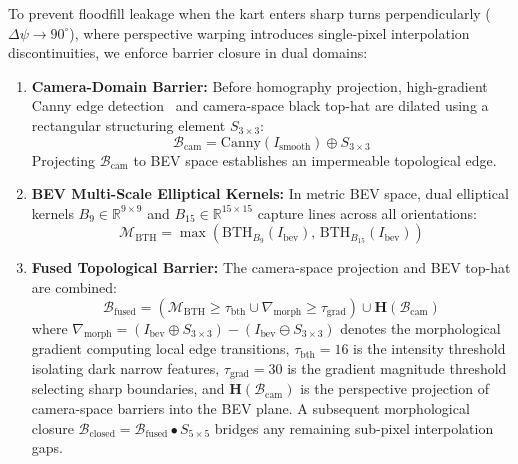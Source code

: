 \documentclass[10pt,journal,compsoc]{IEEEtran}
\begin{document}
To prevent floodfill leakage when the kart enters sharp turns perpendicularly ($\Delta\psi \to 90^\circ$), where perspective warping introduces single-pixel interpolation discontinuities, we enforce barrier closure in dual domains:
\begin{enumerate}
    \item \textbf{Camera-Domain Barrier:} Before homography projection, high-gradient Canny edge detection~\cite{canny1986computational} and camera-space black top-hat are dilated using a rectangular structuring element $S_{3 \times 3}$:
    \begin{equation}
    \mathcal{B}_{\text{cam}} = \text{Canny}(I_{\text{smooth}}) \oplus S_{3 \times 3}
    \end{equation}
    Projecting $\mathcal{B}_{\text{cam}}$ to BEV space establishes an impermeable topological edge.
    \item \textbf{BEV Multi-Scale Elliptical Kernels:} In metric BEV space, dual elliptical kernels $B_9 \in \mathbb{R}^{9 \times 9}$ and $B_{15} \in \mathbb{R}^{15 \times 15}$ capture lines across all orientations:
    \begin{equation}
    \mathcal{M}_{\text{BTH}} = \max\left(\text{BTH}_{B_9}(I_{\text{bev}}), \, \text{BTH}_{B_{15}}(I_{\text{bev}})\right)
    \end{equation}
    \item \textbf{Fused Topological Barrier:} The camera-space projection and BEV top-hat are combined:
    \begin{equation}
    \mathcal{B}_{\text{fused}} = \left(\mathcal{M}_{\text{BTH}} \ge \tau_{\text{bth}} \cup \nabla_{\text{morph}} \ge \tau_{\text{grad}}\right) \cup \mathbf{H}(\mathcal{B}_{\text{cam}})
    \end{equation}
    where $\nabla_{\text{morph}} = (I_{\text{bev}} \oplus S_{3 \times 3}) - (I_{\text{bev}} \ominus S_{3 \times 3})$ denotes the morphological gradient computing local edge transitions, $\tau_{\text{bth}} = 16$ is the intensity threshold isolating dark narrow features, $\tau_{\text{grad}} = 30$ is the gradient magnitude threshold selecting sharp boundaries, and $\mathbf{H}(\mathcal{B}_{\text{cam}})$ is the perspective projection of camera-space barriers into the BEV plane.
    A subsequent morphological closure $\mathcal{B}_{\text{closed}} = \mathcal{B}_{\text{fused}} \bullet S_{5 \times 5}$ bridges any remaining sub-pixel interpolation gaps.
\end{enumerate}
\end{document}
